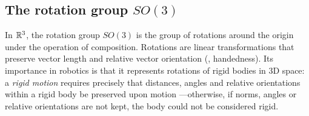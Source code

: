 \subsection{The rotation group $SO(3)$}

In ${\mathbb R}^3$, the rotation group $SO(3)$ is the group of rotations around the origin under the operation of composition. Rotations are linear transformations that preserve vector length and relative vector orientation (\ie, handedness). Its importance in robotics is that it represents rotations of rigid bodies in 3D space: a \emph{rigid motion} requires precisely that distances, angles and relative orientations within a rigid body be preserved upon motion ---otherwise, if norms, angles or relative orientations are not kept, the body could not be considered rigid.


